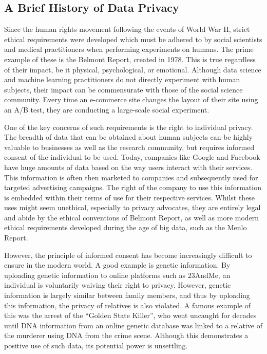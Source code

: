   \subsection{A Brief History of Data Privacy}
  
  Since the human rights movement following the events of World War II, strict ethical requirements were developed which must be adhered to by social scientists and medical practitioners when performing experiments on humans. The prime example of these is the Belmont Report, created in 1978. This is true regardless of their impact, be it physical, psychological, or emotional. Although data science and machine learning practitioners do not directly experiment with human subjects, their impact can be commensurate with those of the social science community. Every time an e-commerce site changes the layout of their site using an A/B test, they are conducting a large-scale social experiment. 
  
  One of the key concerns of such requirements is the right to individual privacy. The breadth of data that can be obtained about human subjects can be highly valuable to businesses as well as the research community, but requires informed consent of the individual to be used. Today, companies like Google and Facebook have huge amounts of data based on the way users interact with their services. This information is often then marketed to companies and subsequently used for targeted advertising campaigns. The right of the company to use this information is embedded within their terms of use for their respective services. Whilst these uses might seem unethical, especially to privacy advocates, they are entirely legal and abide by the ethical conventions of Belmont Report, as well as more modern ethical requirements developed during the age of big data, such as the Menlo Report. 
  
  However, the principle of informed consent has become increasingly difficult to ensure in the modern world. A good example is genetic information. By uploading genetic information to online platforms such as 23AndMe, an individual is voluntarily waiving their right to privacy. However, genetic information is largely similar between family members, and thus by uploading this information, the privacy of relatives is also violated. A famous example of this was the arrest of the “Golden State Killer”, who went uncaught for decades until DNA information from an online genetic database was linked to a relative of the murderer using DNA from the crime scene. Although this demonstrates a positive use of such data, its potential power is unsettling.
  
